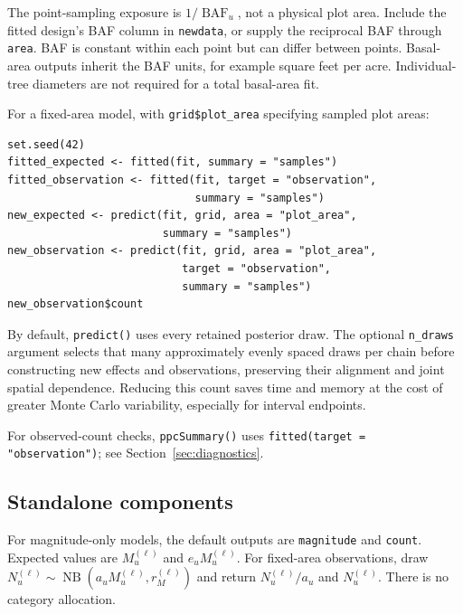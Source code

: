 \documentclass[11pt]{article}
\begin{document}
The point-sampling exposure is \(1/\operatorname{BAF}_u\), not a physical
plot area. Include the fitted design's BAF column in \texttt{newdata}, or
supply the reciprocal BAF through \texttt{area}.
BAF is constant within each point but can differ between points.
Basal-area outputs inherit the BAF units, for example square feet per acre.
Individual-tree diameters are not required for a total basal-area fit.

For a fixed-area model, with \texttt{grid\$plot\_area} specifying sampled plot areas:
\begin{verbatim}
set.seed(42)
fitted_expected <- fitted(fit, summary = "samples")
fitted_observation <- fitted(fit, target = "observation",
                             summary = "samples")
new_expected <- predict(fit, grid, area = "plot_area",
                        summary = "samples")
new_observation <- predict(fit, grid, area = "plot_area",
                           target = "observation",
                           summary = "samples")
new_observation$count
\end{verbatim}

By default, \texttt{predict()} uses every retained posterior draw. The optional
\texttt{n\_draws} argument selects that many approximately evenly spaced draws
per chain before constructing new effects and observations, preserving their
alignment and joint spatial dependence. Reducing this count saves time and memory at the
cost of greater Monte Carlo variability, especially for interval endpoints.

For observed-count checks, \texttt{ppcSummary()} uses
\texttt{fitted(target = "observation")}; see Section~\ref{sec:diagnostics}.

\subsection{Standalone components}
\label{sec:standalone-components}

For magnitude-only models, the default outputs are \texttt{magnitude} and
\texttt{count}. Expected values are \(M_u^{(\ell)}\) and
\(e_uM_u^{(\ell)}\). For fixed-area observations, draw
\(N_u^{(\ell)}\sim\operatorname{NB}(a_uM_u^{(\ell)},r_M^{(\ell)})\)
and return \(N_u^{(\ell)}/a_u\) and \(N_u^{(\ell)}\). There is no
category allocation.
\end{document}
